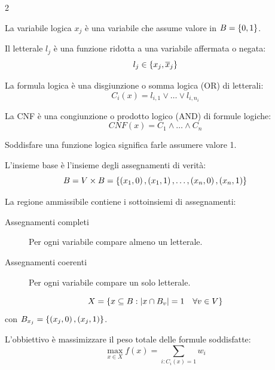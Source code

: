 \documentclass[\main/main.tex]{subfiles}
\begin{document}
\begin{multicols}{2}
    \begin{property}
        La variabile logica \(x_{j}\) è una variabile che assume valore in \(B = \left\{0, 1\right\}\).
    \end{property}
    \begin{property}[Letterale]
        Il letterale \(l_{j}\) è una funzione ridotta a una variabile affermata o negata:
        \[
            l_{j} \in \left\{x_{j}, \overline{x}_{j}\right\}
        \]
    \end{property}
    \begin{property}
        La formula logica è una disgiunzione o somma logica (OR) di letterali:
        \[
            C_i(x) = l_{i, 1} \lor \ldots \lor l_{i, n_i}
        \]
    \end{property}
    \begin{property}[CNF]
        La CNF è una congiunzione o prodotto logico (AND) di formule logiche:
        \[
            CNF(x) = C_1 \land \ldots \land C_n
        \]
    \end{property}
    \begin{property}
        Soddisfare una funzione logica significa farle assumere valore 1.
    \end{property}
    \begin{definition}
        L'insieme base è l'insieme degli assegnamenti di verità:
        \[
            B = V \times B = \left\{\left(x_1, 0\right), \left(x_1, 1\right), \ldots, \left(x_n, 0\right), \left(x_n, 1\right)\right\}
        \]
    \end{definition}
    \begin{definition}
        La regione ammissibile contiene i sottoinsiemi di assegnamenti:
        \begin{description}
            \item[Assegnamenti completi] Per ogni variabile compare almeno un letterale.
            \item[Assegnamenti coerenti] Per ogni variabile compare un solo letterale.
        \end{description}
        \[
            X = \left\{x \subseteq B: \left\lvert x \cap B_v\right\rvert = 1 \quad \forall v \in V\right\}
        \]
        con \(B_{x_j} = \left\{\left(x_j, 0\right), \left(x_j, 1\right)\right\}\).
    \end{definition}
    \begin{definition}
        L'obbiettivo è massimizzare il peso totale delle formule soddisfatte:
        \[
            \max_{x \in X} f(x) = \sum_{i: C_i (x) = 1} w_i
        \]
    \end{definition}
\end{multicols}
\end{document}
